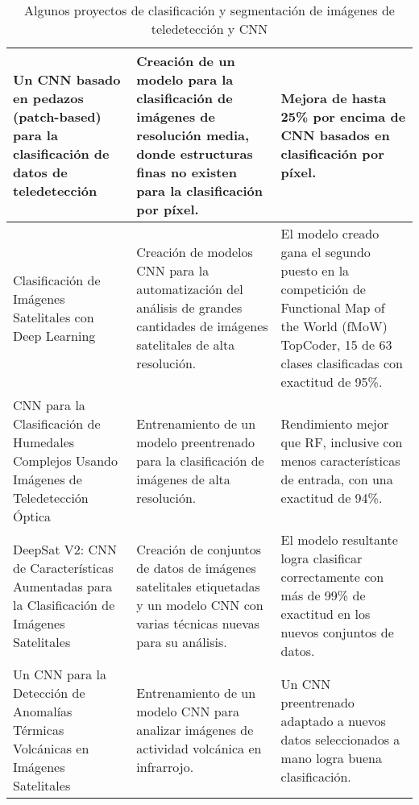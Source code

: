 \begin{center}
\begin{table}[h!]
\begin{tabular}{|m{4cm}|m{5cm}|m{6.2cm}|}
            \hline
            Un CNN basado en pedazos (patch-based) para la clasificación de datos de teledetección \autocite{sharma-2017} & Creación de un modelo para la clasificación de imágenes de resolución media, donde estructuras finas no existen para la clasificación por píxel. & Mejora de hasta 25\% por encima de CNN basados en clasificación por píxel. \\
            \hline
            Clasificación de Imágenes Satelitales con Deep Learning \autocite{pritt-2017} & Creación de modelos CNN para la automatización del análisis de grandes cantidades de imágenes satelitales de alta resolución. & El modelo creado gana el segundo puesto en la competición de Functional Map of the World (fMoW) TopCoder, 15 de 63 clases clasificadas con exactitud de 95\%. \\
            \hline
            CNN para la Clasificación de Humedales Complejos Usando Imágenes de Teledetección Óptica \autocite{rezaee-2018} & Entrenamiento de un modelo preentrenado para la clasificación de imágenes de alta resolución. & Rendimiento mejor que RF, inclusive con menos características de entrada, con una exactitud de 94\%. \\
            \hline
            DeepSat V2: CNN de Características Aumentadas para la Clasificación de Imágenes Satelitales \autocite{liu-2019} & Creación de conjuntos de datos de imágenes satelitales etiquetadas y un modelo CNN con varias técnicas nuevas para su análisis. & El modelo resultante logra clasificar correctamente con más de 99\% de exactitud en los nuevos conjuntos de datos. \\
            \hline
            Un CNN para la Detección de Anomalías Térmicas Volcánicas en Imágenes Satelitales \autocite{amato-2023} & Entrenamiento de un modelo CNN para analizar imágenes de actividad volcánica en infrarrojo. & Un CNN preentrenado adaptado a nuevos datos seleccionados a mano logra buena clasificación. \\
            \hline
        \end{tabular}
        \caption{Algunos proyectos de clasificación y segmentación de imágenes de teledetección y CNN}
        \label{table:1}
    \end{table}
    \vspace{-\topsep}
\end{center}

